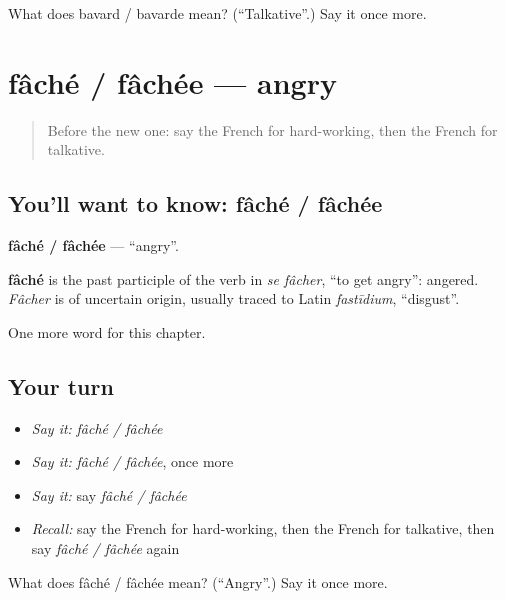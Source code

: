 \begin{tcolorbox}[breakable,colback=teal!4,colframe=teal!35!black,title={Before you move on}]
What does bavard / bavarde mean? (\textquotedblleft{}Talkative\textquotedblright{}.) Say it once more.
\end{tcolorbox}
\section[fâché / fâchée]{fâché / fâchée — angry}

\label{lesson:FR-C246-fache-fachee}



\begin{quote}
Before the new one: say the French for hard-working, then the French for talkative.
\end{quote}

\subsection*{You'll want to know: fâché / fâchée}
\textbf{fâché / fâchée} — \textquotedblleft{}angry\textquotedblright{}.

\begin{cousinweb}
\textbf{fâché} is the past participle of the verb in \emph{se fâcher}, \textquotedblleft{}to get angry\textquotedblright{}: angered. \emph{Fâcher} is of uncertain origin, usually traced to Latin \emph{fastīdium}, \textquotedblleft{}disgust\textquotedblright{}.
\end{cousinweb}

\begin{grammarlens}[title={What you've built}]
One more word for this chapter.
\end{grammarlens}

\subsection*{Your turn}
\begin{itemize}
\raggedright
  \item \emph{Say it:} \emph{fâché / fâchée}
  \item \emph{Say it:} \emph{fâché / fâchée}, once more
  \item \emph{Say it:} say \emph{fâché / fâchée}
  \item \emph{Recall:} say the French for hard-working, then the French for talkative, then say \emph{fâché / fâchée} again
\end{itemize}

\begin{tcolorbox}[breakable,colback=teal!4,colframe=teal!35!black,title={Before you move on}]
What does fâché / fâchée mean? (\textquotedblleft{}Angry\textquotedblright{}.) Say it once more.
\end{tcolorbox}
